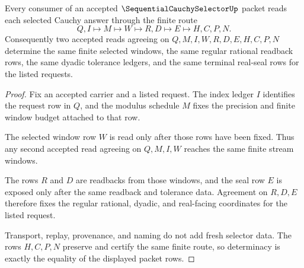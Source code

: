 \begin{theorem}
\label{thm:sequential-cauchy-selector-finite-window-determinacy}
Every consumer of an accepted $\SequentialCauchySelectorUp$ packet reads each selected Cauchy answer through the finite route
$$
Q,I \longmapsto M \longmapsto W \longmapsto R,D \longmapsto E \longmapsto H,C,P,N.
$$
Consequently two accepted reads agreeing on $Q,M,I,W,R,D,E,H,C,P,N$ determine the same finite selected windows, the same regular rational readback rows, the same dyadic tolerance ledgers, and the same terminal real-seal rows for the listed requests.
\end{theorem}
\begin{proof}
Fix an accepted carrier and a listed request. The index ledger $I$ identifies the request row in $Q$, and the modulus schedule $M$ fixes the precision and finite window budget attached to that row.

The selected window row $W$ is read only after those rows have been fixed. Thus any second accepted read agreeing on $Q,M,I,W$ reaches the same finite stream windows.

The rows $R$ and $D$ are readbacks from those windows, and the seal row $E$ is exposed only after the same readback and tolerance data. Agreement on $R,D,E$ therefore fixes the regular rational, dyadic, and real-facing coordinates for the listed request.

Transport, replay, provenance, and naming do not add fresh selector data. The rows $H,C,P,N$ preserve and certify the same finite route, so determinacy is exactly the equality of the displayed packet rows.
\end{proof}

